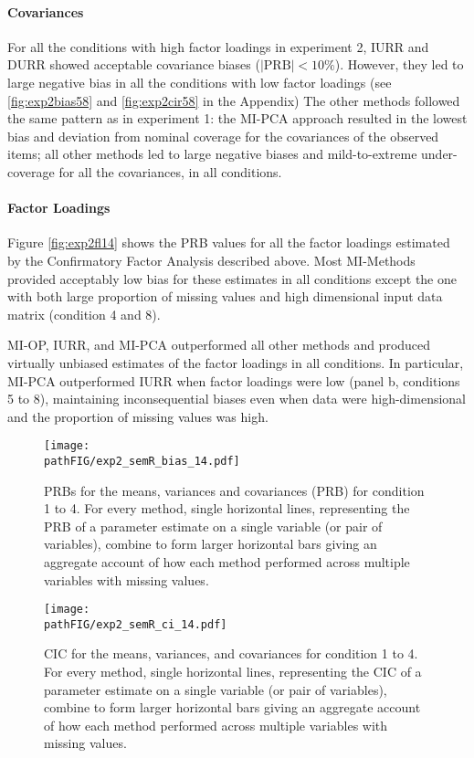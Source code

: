 \documentclass[]{./cls/interact}
\theoremstyle{plain}
\theoremstyle{definition}
\theoremstyle{remark}
\newcommand{\pathFIG}{./figures}
\begin{document}
	\paragraph{Covariances}
	For all the conditions with high factor loadings in experiment 2, IURR and DURR showed acceptable covariance biases 
	($|\text{PRB}|<10\%$).
	However, they led to large negative bias in all the conditions with low factor loadings (see \ref{fig:exp2bias58} and 
	\ref{fig:exp2cir58} in the Appendix)
	The other methods followed the same pattern as in experiment 1: the MI-PCA approach resulted in the lowest 
	bias and deviation from nominal coverage for the covariances of the observed items; 
	all other methods led to large negative biases and mild-to-extreme under-coverage for all the covariances, 
	in all conditions.

	\paragraph{Factor Loadings}
	Figure \ref{fig:exp2fl14} shows the PRB values for all the factor loadings estimated by
	the Confirmatory Factor Analysis described above. 
	Most MI-Methods provided acceptably low bias for these estimates in all conditions except the one with 
	both large proportion of missing values and high dimensional input data matrix (condition 4 and 8).

	MI-OP, IURR, and MI-PCA outperformed all other methods and produced virtually unbiased estimates
	of the factor loadings in all conditions.
	In particular, MI-PCA outperformed IURR when factor loadings were low (panel b, conditions 5 to 8), 
	maintaining inconsequential biases even when data were high-dimensional and the proportion of missing 
	values was high.

\begin{figure}
	\texttt{[image: \\pathFIG/exp2\_semR\_bias\_14.pdf]}
\caption{PRBs for the means, variances and covariances (PRB) for condition 1 to 4.
	For every method, single horizontal lines, representing the PRB of a parameter estimate on 
	a single variable (or pair of variables), combine to form larger horizontal bars giving an 
	aggregate account of how each method performed across multiple variables with missing values.
}
\label{fig:exp2bias14}
\end{figure}

\begin{figure}
	\texttt{[image: \\pathFIG/exp2\_semR\_ci\_14.pdf]}
\caption{CIC for the means, variances, and covariances for condition 1 to 4.
	For every method, single horizontal lines, representing the CIC of a parameter estimate on 
	a single variable (or pair of variables), combine to form larger horizontal bars giving an 
	aggregate account of how each method performed across multiple variables with missing values.
}
\label{fig:exp2cir14}
\end{figure}
\end{document}
